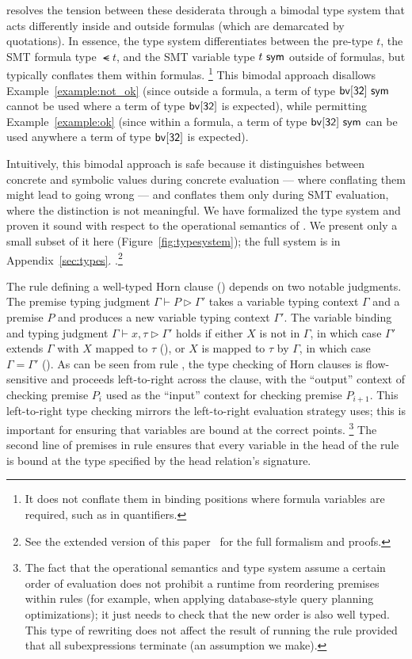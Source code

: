 \documentclass[acmsmall,screen,nonacm]{acmart}
\theoremstyle{definition}
\begin{document}
\Name resolves the tension between these desiderata through a bimodal type
system that acts differently inside and outside formulas (which are demarcated
by quotations).
In essence, the \Name type system differentiates between the pre-type $t$, the
SMT formula type $\smt{t}$, and the SMT variable type ${t} ~ \mathsf{sym}$ outside of
formulas, but typically conflates them within formulas.%
\footnote{It does not conflate them in binding positions where formula
variables are required, such as in quantifiers.}
This bimodal approach disallows Example~\ref{example:not_ok} (since outside a
formula, a term of type ${\mathsf{bv[32]}} ~ \mathsf{sym}$ cannot be used where a term of type
$\mathsf{bv[32]}$ is expected), while permitting Example~\ref{example:ok} (since within
a formula, a term of type ${\mathsf{bv[32]}} ~ \mathsf{sym}$ can be used anywhere a term of type
$\mathsf{bv[32]}$ is expected).

Intuitively, this bimodal approach is safe because it distinguishes between
concrete and symbolic values during concrete evaluation --- where conflating them
might lead to going wrong --- and conflates them only during SMT evaluation,
where the distinction is not meaningful.
We have formalized the \Name type system and proven it sound with respect to
the operational semantics of \Name.
We present only a small subset of it here (Figure~\ref{fig:typesystem})\iffull; the
full system is in Appendix~\ref{sec:types}.\else%
.\footnote{See the extended version of this paper~\citep{formulog_ext} for the full formalism and proofs.}\fi

The rule defining a well-typed Horn clause () depends on two
notable judgments.
The premise typing judgment $\Gamma \vdash P \rhd \Gamma'$ takes a variable
typing context $\Gamma$ and a premise $P$ and produces a new variable typing
context $\Gamma'$.
The variable binding and typing judgment $\Gamma \vdash x,\tau \rhd \Gamma'$
holds if either $X$ is not in $\Gamma$, in which case $\Gamma'$ extends
$\Gamma$ with $X$ mapped to $\tau$ (), or $X$ is mapped to
$\tau$ by $\Gamma$, in which case $\Gamma=\Gamma'$ ().
As can be seen from rule , the type checking of Horn clauses is
flow-sensitive and proceeds left-to-right across the clause, with the
``output'' context of checking premise $P_i$ used as the ``input'' context for
checking premise $P_{i+1}$.
This left-to-right type checking mirrors the left-to-right evaluation strategy
\Name uses; this is important for ensuring that variables are bound at the
correct points.%
\footnote{The fact that the operational semantics and type system assume a
certain order of evaluation does not prohibit a \Name runtime from reordering
premises within rules (for example, when applying database-style query planning
optimizations); it just needs to check that the new order is also well typed.
This type of rewriting does not affect the result of running the
rule provided that all subexpressions terminate (an assumption we make).
}
The second line of premises in rule  ensures that every variable
in the head of the rule is bound at the type specified by the head relation's
signature.
\end{document}
